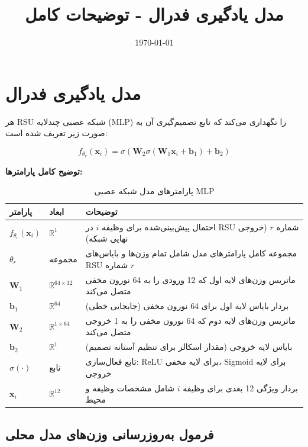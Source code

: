 \documentclass[11pt]{article}
\title{مدل یادگیری فدرال - توضیحات کامل}
\date{\today}
\begin{document}
\maketitle

\section{مدل یادگیری فدرال}

هر RSU شبکه عصبی چندلایه (MLP) را نگهداری می‌کند که تابع تصمیم‌گیری آن به صورت زیر تعریف شده است:

\begin{equation}
f_{\theta_r}(\mathbf{x}_i) = \sigma(\mathbf{W}_2 \sigma(\mathbf{W}_1 \mathbf{x}_i + \mathbf{b}_1) + \mathbf{b}_2)
\label{eq:mlp_model}
\end{equation}

\textbf{توضیح کامل پارامترها:}

\begin{table}[h]
\centering
\begin{tabular}{|p{3cm}|p{2cm}|p{8cm}|}
\hline
\textbf{پارامتر} & \textbf{ابعاد} & \textbf{توضیحات} \\
\hline
$f_{\theta_r}(\mathbf{x}_i)$ & $\mathbb{R}^1$ & احتمال پیش‌بینی‌شده برای وظیفه $i$ در RSU شماره $r$ (خروجی نهایی شبکه) \\
\hline
$\theta_r$ & مجموعه & مجموعه کامل پارامترهای مدل شامل تمام وزن‌ها و بایاس‌های RSU شماره $r$ \\
\hline
$\mathbf{W}_1$ & $\mathbb{R}^{64 \times 12}$ & ماتریس وزن‌های لایه اول که 12 ورودی را به 64 نورون مخفی متصل می‌کند \\
\hline
$\mathbf{b}_1$ & $\mathbb{R}^{64}$ & بردار بایاس لایه اول برای 64 نورون مخفی (جابجایی خطی) \\
\hline
$\mathbf{W}_2$ & $\mathbb{R}^{1 \times 64}$ & ماتریس وزن‌های لایه دوم که 64 نورون مخفی را به 1 خروجی متصل می‌کند \\
\hline
$\mathbf{b}_2$ & $\mathbb{R}^1$ & بایاس لایه خروجی (مقدار اسکالر برای تنظیم آستانه تصمیم) \\
\hline
$\sigma(\cdot)$ & تابع & تابع فعال‌سازی: ReLU برای لایه مخفی، Sigmoid برای لایه خروجی \\
\hline
$\mathbf{x}_i$ & $\mathbb{R}^{12}$ & بردار ویژگی 12 بعدی برای وظیفه $i$ شامل مشخصات وظیفه و محیط \\
\hline
\end{tabular}
\caption{پارامترهای مدل شبکه عصبی MLP}
\end{table}

\subsection{فرمول به‌روزرسانی وزن‌های مدل محلی}
\end{document}
